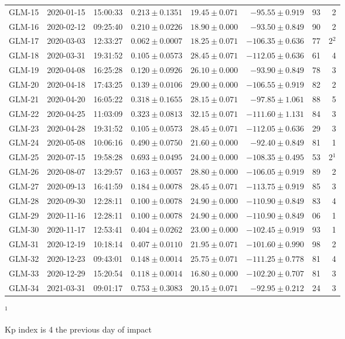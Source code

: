 \begin{table}
\begin{tabular}{rrrrrrrr}
GLM-15 & 2020-01-15 & 15:00:33 & $0.213\pm 0.1351$ & $19.45 \pm 0.071$ & $-95.55 \pm   0.919$ & 93 & 2\\
GLM-16 & 2020-02-12 & 09:25:40 & $0.210\pm 0.0226$ & $18.90 \pm 0.000$ & $-93.50 \pm   0.849$ & 90 & 2\\
GLM-17 & 2020-03-03 & 12:33:27 & $0.062\pm 0.0007$ & $18.25 \pm 0.071$ & $-106.35 \pm 0.636$  & 77 & 2\hyperlink{note2}{${}^2$}\\
GLM-18 & 2020-03-31 & 19:31:52 & $0.105\pm 0.0573$ & $28.45 \pm 0.071$ & $-112.05 \pm  0.636$ & 61 & 4\\
GLM-19 & 2020-04-08 & 16:25:28 & $0.120\pm 0.0926$ & $26.10 \pm 0.000$ & $-93.90 \pm   0.849$ & 78 & 3\\
GLM-20 & 2020-04-18 & 17:43:25 & $0.139\pm 0.0106$ & $29.00 \pm 0.000$ & $-106.55 \pm  0.919$ & 82 & 2\\
GLM-21 & 2020-04-20 & 16:05:22 & $0.318\pm 0.1655$ & $28.15 \pm 0.071$ & $-97.85 \pm   1.061$ & 88 & 5\\
GLM-22 & 2020-04-25 & 11:03:09 & $0.323\pm 0.0813$ & $32.15 \pm 0.071$ & $-111.60 \pm  1.131$ & 84 & 3\\
GLM-23 & 2020-04-28 & 19:31:52 & $0.105\pm 0.0573$ & $28.45 \pm 0.071$ & $-112.05 \pm  0.636$ & 29 & 3\\
GLM-24 & 2020-05-08 & 10:06:16 & $0.490\pm 0.0750$ & $21.60 \pm 0.000$ & $-92.40 \pm   0.849$ & 81 & 1\\
GLM-25 & 2020-07-15 & 19:58:28 & $0.693\pm 0.0495$ & $24.00 \pm 0.000$ & $-108.35 \pm  0.495$ & 53 & 2\hyperlink{note}{${}^1$}\\
GLM-26 & 2020-08-07 & 13:29:57 & $0.163\pm 0.0057$ & $28.80 \pm 0.000$ & $-106.05 \pm  0.919$ & 89 & 2\\
GLM-27 & 2020-09-13 & 16:41:59 & $0.184\pm 0.0078$ & $28.45 \pm 0.071$ & $-113.75 \pm  0.919$ & 85 & 3\\
GLM-28 & 2020-09-30 & 12:28:11 & $0.100\pm 0.0078$ & $24.90 \pm 0.000$ & $-110.90 \pm  0.849$ & 83 & 4\\
GLM-29 & 2020-11-16 & 12:28:11 & $0.100\pm 0.0078$ & $24.90 \pm 0.000$ & $-110.90 \pm  0.849$ & 06 & 1\\
GLM-30 & 2020-11-17 & 12:53:41 & $0.404\pm 0.0262$ & $23.00 \pm 0.000$ & $-102.45 \pm  0.919$ & 93 & 1\\
GLM-31 & 2020-12-19 & 10:18:14 & $0.407\pm 0.0110$ & $21.95 \pm 0.071$ & $-101.60 \pm  0.990$ & 98 & 2\\
GLM-32 & 2020-12-23 & 09:43:01 & $0.148\pm 0.0014$ & $25.75 \pm 0.071$ & $-111.25 \pm  0.778$ & 81 & 4\\
GLM-33 & 2020-12-29 & 15:20:54 & $0.118\pm 0.0014$ & $16.80 \pm 0.000$ & $-102.20 \pm  0.707$ & 81 & 3\\
GLM-34 & 2021-03-31 & 09:01:17 & $0.753\pm 0.3083$ & $20.15 \pm 0.071$ & $-92.95 \pm  0.212$  & 24 & 3\\\hline
\end{tabular}
    \begin{minipage}{0.9\linewidth}
      \footnotesize
      \hypertarget{note}{${}^1$} Kp index is 4 the previous day of impact
      

\end{minipage}
\end{table}
